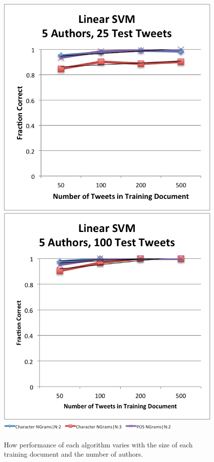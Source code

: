 \documentclass[pageno]{jpaper}
\begin{document}
\begin{figure}[h!]
\begin{center}
\includegraphics*[scale=.75]{LinearSVMVaryTrain5Auth25Test}
\includegraphics*[scale=.75]{LinearSVMVaryTrain5Auth100Test}
\includegraphics*{4graphLegend}
\end{center}
\caption{How performance of each algorithm varies with the size of each training document and the number of authors.}
\label{fig:GeneralVaryingTrain}
\end{figure}
\end{document}
